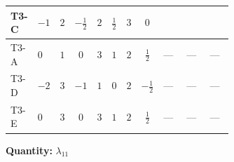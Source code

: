 \documentclass[8pt]{article}
\begin{document}
\begin{landscape}
\begin{longtable}{@{}llcccccc >{\raggedright\arraybackslash}p{0.21\linewidth} >{\raggedright\arraybackslash}p{0.21\linewidth} >{\raggedright\arraybackslash}p{0.21\linewidth}@{}}
\midrule
T3-C & $-1$ & $2$ & $-\frac{1}{2}$ & $2$ & $\frac{1}{2}$ & $3$ & $0$ & \scriptsize\adjustbox{max width=\linewidth}{$\begin{gathered} +{\lambda_{12}^{(1)}} (6 {\lambda_{10}}+6 {\lambda_{11}})\end{gathered}$} & \scriptsize\adjustbox{max width=\linewidth}{$\begin{gathered} +{\lambda_{12}^{(A)}} \left(\frac{{\lambda_{10}}}{6}+\frac{5 {\lambda_{11}}}{6}\right)\end{gathered}$} & \scriptsize\adjustbox{max width=\linewidth}{$\begin{gathered} +2 {\lambda_{HS_1}^{(1)}} {\lambda_{H H^\dagger S_1^\dagger S_2^\dagger}^{\rm Cross}}\end{gathered}$} \\
\midrule
T3-A & $0$ & $1$ & $0$ & $3$ & $1$ & $2$ & $\frac{1}{2}$ & --- & --- & --- \\
\midrule
T3-D & $-2$ & $3$ & $-1$ & $1$ & $0$ & $2$ & $-\frac{1}{2}$ & --- & --- & --- \\
\midrule
T3-E & $0$ & $3$ & $0$ & $3$ & $1$ & $2$ & $\frac{1}{2}$ & --- & --- & --- \\
\midrule
\bottomrule
\end{longtable}
\clearpage
\noindent\textbf{Quantity: }$\lambda_{11}$\par\smallskip

\end{landscape}
\end{document}
